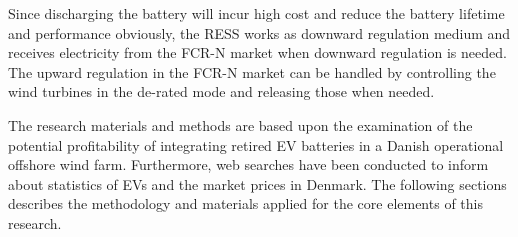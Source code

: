 Since discharging the battery will incur high cost and reduce the battery lifetime and performance
obviously, the RESS works as downward regulation medium and receives electricity from the FCR-N market when downward regulation is needed. The upward regulation in the FCR-N market can be handled by controlling the wind turbines in the de-rated mode and releasing those when needed. 

The research materials and methods are based upon the examination of the potential profitability of integrating retired EV batteries in a Danish operational offshore wind farm. Furthermore, web searches have been conducted to inform about statistics of EVs and the market prices in Denmark. The following sections describes the methodology and materials applied for the core elements of this research. 